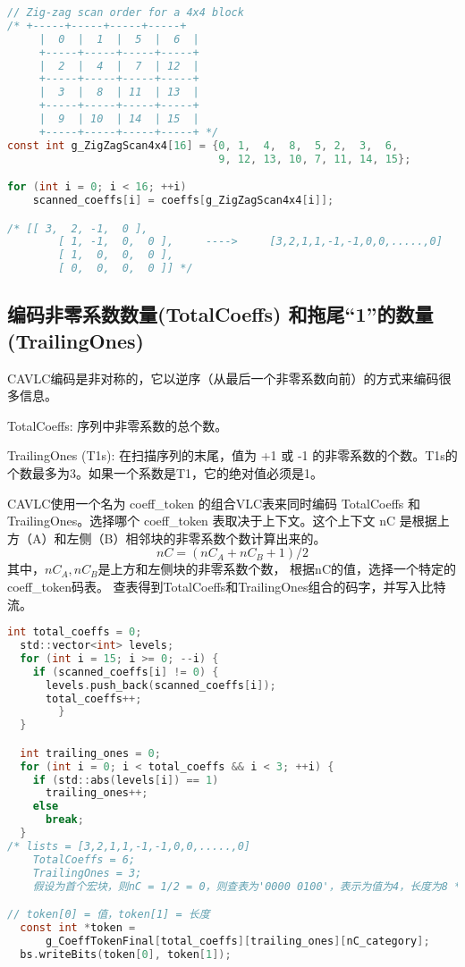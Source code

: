 \documentclass{/Users/hi/Study/template/code}
\begin{document}
\begin{lstlisting}[language=c]
// Zig-zag scan order for a 4x4 block
/* +-----+-----+-----+-----+
	 |  0  |  1  |  5  |  6  |
	 +-----+-----+-----+-----+
	 |  2  |  4  |  7  | 12  |
	 +-----+-----+-----+-----+
	 |  3  |  8  | 11  | 13  |
	 +-----+-----+-----+-----+
	 |  9  | 10  | 14  | 15  |
	 +-----+-----+-----+-----+ */
const int g_ZigZagScan4x4[16] = {0, 1,  4,  8,  5, 2,  3,  6,
                                 9, 12, 13, 10, 7, 11, 14, 15};

for (int i = 0; i < 16; ++i) 
	scanned_coeffs[i] = coeffs[g_ZigZagScan4x4[i]];

/* [[ 3,  2, -1,  0 ],
		[ 1, -1,  0,  0 ],     ---->     [3,2,1,1,-1,-1,0,0,.....,0]
		[ 1,  0,  0,  0 ],
		[ 0,  0,  0,  0 ]] */
\end{lstlisting}


\subsection{编码非零系数数量(TotalCoeffs) 和拖尾“1”的数量 (TrailingOnes)}
CAVLC编码是非对称的，它以逆序（从最后一个非零系数向前）的方式来编码很多信息。

\begin{definition}
	TotalCoeffs: 序列中非零系数的总个数。
\end{definition}
\begin{definition}
	TrailingOnes (T1s): 在扫描序列的末尾，值为 +1 或 -1 的非零系数的个数。T1s的个数最多为3。如果一个系数是T1，它的绝对值必须是1。
\end{definition}


CAVLC使用一个名为 coeff\_token 的组合VLC表来同时编码 TotalCoeffs 和 TrailingOnes。选择哪个 coeff\_token 表取决于上下文。这个上下文 nC 是根据上方（A）和左侧（B）相邻块的非零系数个数计算出来的。
\begin{equation}
	nC = (nC_A + nC_B + 1) / 2
\end{equation}
其中，$nC_A, nC_B$是上方和左侧块的非零系数个数，
根据nC的值，选择一个特定的coeff\_token码表。
查表得到TotalCoeffs和TrailingOnes组合的码字，并写入比特流。

\begin{lstlisting}[language=c]
  int total_coeffs = 0;
  std::vector<int> levels;
  for (int i = 15; i >= 0; --i) {
    if (scanned_coeffs[i] != 0) {
      levels.push_back(scanned_coeffs[i]);
      total_coeffs++;
		}
  }

  int trailing_ones = 0;
  for (int i = 0; i < total_coeffs && i < 3; ++i) {
    if (std::abs(levels[i]) == 1)
      trailing_ones++;
    else
      break;
  }
/* lists = [3,2,1,1,-1,-1,0,0,.....,0]
	TotalCoeffs = 6;
	TrailingOnes = 3;
	假设为首个宏块，则nC = 1/2 = 0，则查表为'0000 0100'，表示为值为4，长度为8 */

// token[0] = 值，token[1] = 长度
  const int *token =
      g_CoeffTokenFinal[total_coeffs][trailing_ones][nC_category];
  bs.writeBits(token[0], token[1]);
\end{lstlisting}
\end{document}
